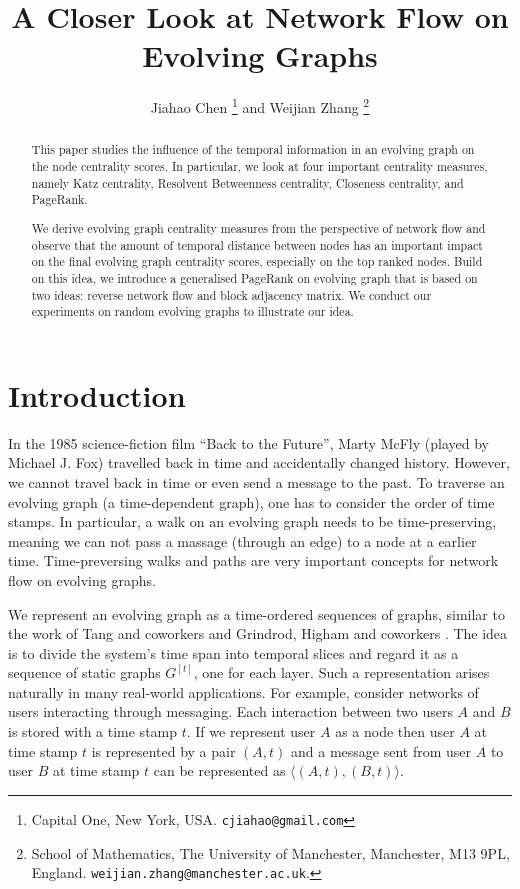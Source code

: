 \documentclass[12pt]{article}
\title{A Closer Look at Network Flow on Evolving Graphs}
\author{Jiahao Chen \thanks{
Capital One,
New York, USA.
\texttt{cjiahao@gmail.com}
}
 and
Weijian Zhang
\thanks{%
  School of Mathematics,
The University of Manchester,
                Manchester, M13 9PL, England.
\texttt{weijian.zhang@manchester.ac.uk}.
}
}
\theoremstyle{definition}
\begin{document}


\maketitle

\begin{abstract}
This paper studies the influence of the temporal information in an evolving graph on the node centrality scores.
In particular, we look at four important centrality measures, namely Katz centrality,
Resolvent Betweenness centrality, Closeness centrality, and PageRank.

We derive evolving graph centrality measures from the perspective of network flow and
observe that the amount of temporal distance between nodes has an important impact on the final evolving graph centrality scores, especially on the top ranked nodes.
Build on this idea, we introduce a generalised PageRank on evolving graph that is based on two ideas:
reverse network flow and block adjacency matrix.
We conduct our experiments on random evolving graphs to illustrate our idea.
\end{abstract}

\section{Introduction}
\label{sec:introduction}

In the 1985 science-fiction film ``Back to the Future'', Marty McFly (played by Michael J. Fox) travelled back in time and accidentally changed history.
However, we cannot travel back in time or even send a message to the past.
To traverse an evolving graph (a time-dependent graph), one has to consider the order of time stamps. In particular, a walk on an evolving graph needs to be time-preserving, meaning we
can not pass a massage (through an edge) to a node at a earlier time.
Time-preversing walks and paths are very important concepts for
network flow on evolving graphs.

We represent an evolving graph as a time-ordered sequences of graphs, similar to the work of Tang and coworkers \cite{ntmm13, tmml09, tmml10, tsmm09} and Grindrod, Higham and coworkers \cite{grihig13,gphe11}. The idea is to divide the system's time span into temporal slices and regard it as a sequence of static graphs $G^{[t]}$, one for each layer. Such a representation arises naturally in many real-world applications. For example,
consider networks of users interacting through messaging. Each interaction between two users $A$ and $B$ is stored with a time stamp $t$. If we represent user $A$ as a node then user $A$ at time stamp $t$ is represented by a pair $(A,t)$ and a message sent from user $A$ to user $B$ at time stamp $t$ can be represented as $\langle (A, t), (B, t) \rangle$.
\end{document}
